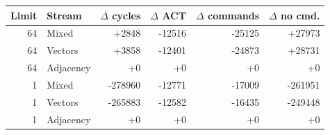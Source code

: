 \begin{tabular}{rlrrrr}
\toprule
Limit & Stream & $\Delta$ cycles & $\Delta$ ACT & $\Delta$ commands & $\Delta$ no cmd. \\
\midrule
64 & Mixed & +2848 & -12516 & -25125 & +27973 \\
64 & Vectors & +3858 & -12401 & -24873 & +28731 \\
64 & Adjacency & +0 & +0 & +0 & +0 \\
1 & Mixed & -278960 & -12771 & -17009 & -261951 \\
1 & Vectors & -265883 & -12582 & -16435 & -249448 \\
1 & Adjacency & +0 & +0 & +0 & +0 \\
\bottomrule
\end{tabular}
